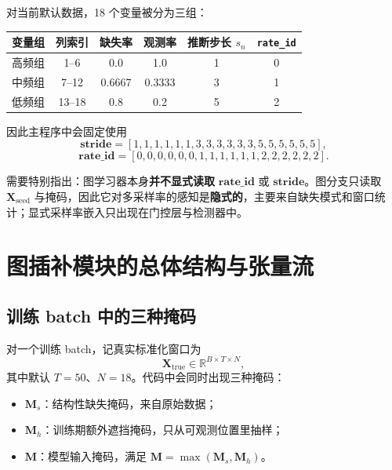\documentclass[UTF8]{ctexart}
\begin{document}
对当前默认数据，18 个变量被分为三组：

\begin{center}
\small
\begin{tabular}{cccccc}
\toprule
变量组 & 列索引 & 缺失率 & 观测率 & 推断步长 \(s_n\) & \texttt{rate\_id} \\
\midrule
高频组 & 1--6 & 0.0 & 1.0 & 1 & 0 \\
中频组 & 7--12 & 0.6667 & 0.3333 & 3 & 1 \\
低频组 & 13--18 & 0.8 & 0.2 & 5 & 2 \\
\bottomrule
\end{tabular}
\end{center}

因此主程序中会固定使用
\begin{equation}
    \bm{stride} = [1,1,1,1,1,1,3,3,3,3,3,3,5,5,5,5,5,5],
\end{equation}
\begin{equation}
    \bm{rate\_id} = [0,0,0,0,0,0,1,1,1,1,1,1,2,2,2,2,2,2].
\end{equation}

需要特别指出：图学习器本身\textbf{并不显式读取} \(\bm{rate\_id}\) 或 \(\bm{stride}\)。图分支只读取 \(\bm{X}_{\text{seed}}\) 与掩码，因此它对多采样率的感知是\textbf{隐式的}，主要来自缺失模式和窗口统计；显式采样率嵌入只出现在门控层与检测器中。

\section{图插补模块的总体结构与张量流}

\subsection{训练 batch 中的三种掩码}

对一个训练 batch，记真实标准化窗口为
\begin{equation}
    \bm{X}_{\text{true}} \in \mathbb{R}^{B \times T \times N},
\end{equation}
其中默认 \(T=50\)、\(N=18\)。代码中会同时出现三种掩码：
\begin{itemize}
    \item \(\bm{M}_{s}\)：结构性缺失掩码，来自原始数据；
    \item \(\bm{M}_{h}\)：训练期额外遮挡掩码，只从可观测位置里抽样；
    \item \(\bm{M}\)：模型输入掩码，满足 \(\bm{M}=\max(\bm{M}_{s},\bm{M}_{h})\)。
\end{itemize}
\end{document}
